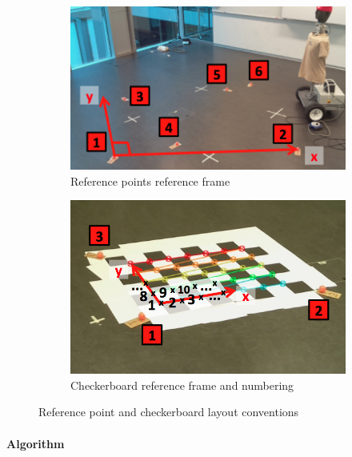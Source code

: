 \begin{figure}[H]
	\centering
	\begin{subfigure}[b]{0.49\linewidth}
        \centering
		\includegraphics[height=0.6\linewidth]{files/ref_points.png}
		\caption{Reference points reference frame}
        \label{fig:ref_points}
	\end{subfigure}
	\begin{subfigure}[b]{0.49\linewidth}
        \centering
		\includegraphics[height=0.6\linewidth]{files/ref_checkerboard.png}
		\caption{Checkerboard reference frame and numbering}
		\label{fig:ref_checkerboard.png}
	\end{subfigure}
	\caption{Reference point and checkerboard layout conventions} 
\end{figure}

\paragraph{Algorithm}

